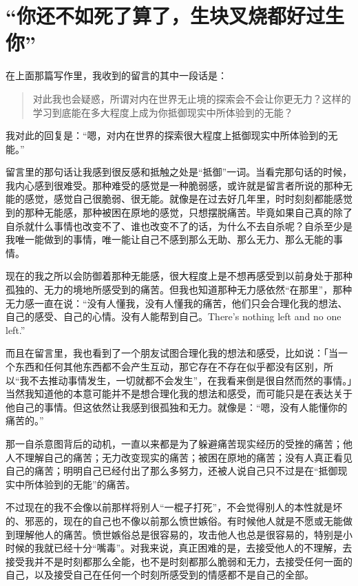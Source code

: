 \chapter{“你还不如死了算了，生块叉烧都好过生你”}




在上面那篇写作里，我收到的留言的其中一段话是：

\blockquote{
	对此我也会疑惑，所谓对内在世界无止境的探索会不会让你更无力？这样的学习到底能在多大程度上成为你抵御现实中所体验到的无能？
}

我对此的回复是：“嗯，对内在世界的探索很大程度上抵御现实中所体验到的无能。”

留言里的那句话让我感到很反感和抵触之处是“抵御”一词。当看完那句话的时候，我内心感到很难受。那种难受的感觉是一种脆弱感，或许就是留言者所说的那种无能的感觉，感觉自己很脆弱、很无能。就像是在过去好几年里，时时刻刻都能感觉到的那种无能感，那种被困在原地的感觉，只想摆脱痛苦。毕竟如果自己真的除了自杀就什么事情也改变不了、谁也改变不了的话，为什么不去自杀呢？自杀至少是我唯一能做到的事情，唯一能让自己不感到那么无助、那么无力、那么无能的事情。

现在的我之所以会防御着那种无能感，很大程度上是不想再感受到以前身处于那种孤独的、无力的境地所感受到的痛苦。但我也知道那种无力感依然“在那里”，那种无力感一直在说：“没有人懂我，没有人懂我的痛苦，他们只会合理化我的想法、自己的感受、自己的心情。没有人能帮到自己。There's nothing left and no one left.”

而且在留言里，我也看到了一个朋友试图合理化我的想法和感受，比如说：「当一个东西和任何其他东西都不会产生互动，那它存在不存在似乎都没有区别，所以“我不去推动事情发生，一切就都不会发生”，在我看来倒是很自然而然的事情。」当然我知道他的本意可能并不是想合理化我的想法和感受，而可能只是在表达关于他自己的事情。但这依然让我感到很孤独和无力。就像是：“嗯，没有人能懂你的痛苦的。”

那一自杀意图背后的动机，一直以来都是为了躲避痛苦\pozhehao{}现实经历的受挫的痛苦；他人不理解自己的痛苦；无力改变现实的痛苦；被困在原地的痛苦；没有人真正看见自己的痛苦；明明自己已经付出了那么多努力，还被人说自己只不过是在“抵御现实中所体验到的无能”的痛苦。

不过现在的我不会像以前那样将别人“一棍子打死”，不会觉得别人的本性就是坏的、邪恶的，现在的自己也不像以前那么愤世嫉俗。有时候他人就是不愿或无能做到理解他人的痛苦。愤世嫉俗总是很容易的，攻击他人也总是很容易的，特别是小时候的我就已经十分“嘴毒”。对我来说，真正困难的是，去接受他人的不理解，去接受我并不是时刻都那么全能，也不是时刻都那么脆弱和无力，去接受任何一面的自己，以及接受自己在任何一个时刻所感受到的情感都不是自己的全部。

